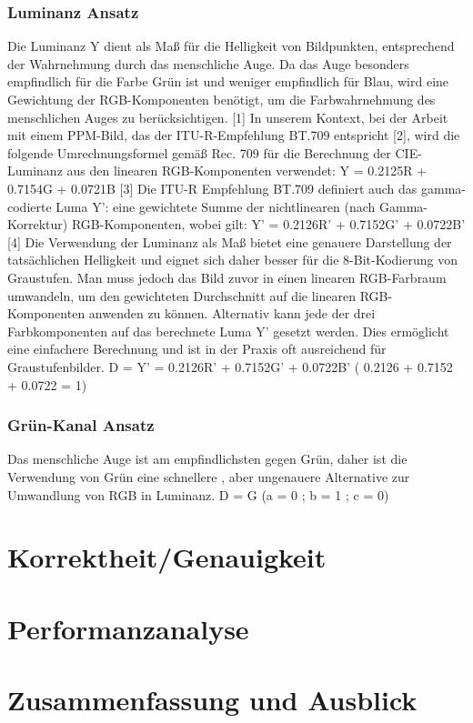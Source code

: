 \documentclass[course=erap]{aspdoc}
\begin{document}
\subsubsection{Luminanz Ansatz}
Die Luminanz Y dient als Maß für die Helligkeit von Bildpunkten, entsprechend der Wahrnehmung durch das menschliche Auge. Da das Auge besonders empfindlich für die Farbe Grün ist und weniger empfindlich für Blau, wird eine Gewichtung der RGB-Komponenten benötigt, um die Farbwahrnehmung des menschlichen Auges zu berücksichtigen. [1]
In unserem Kontext, bei der Arbeit mit einem PPM-Bild, das der ITU-R-Empfehlung BT.709 entspricht [2], wird die folgende Umrechnungsformel gemäß Rec. 709 für die Berechnung der CIE-Luminanz aus den linearen RGB-Komponenten verwendet:
Y = 0.2125R + 0.7154G + 0.0721B  [3]
Die ITU-R Empfehlung BT.709 definiert auch das gamma-codierte Luma Y': eine gewichtete Summe der nichtlinearen (nach Gamma-Korrektur) RGB-Komponenten, wobei gilt:
Y' = 0.2126R' + 0.7152G' + 0.0722B' [4]
Die Verwendung der Luminanz als Maß bietet eine genauere Darstellung der tatsächlichen Helligkeit und eignet sich daher besser für die 8-Bit-Kodierung von Graustufen. Man muss jedoch das Bild zuvor in einen linearen RGB-Farbraum umwandeln, um den gewichteten Durchschnitt auf die linearen RGB-Komponenten anwenden zu können.
Alternativ kann jede der drei Farbkomponenten auf das berechnete Luma Y' gesetzt werden. Dies ermöglicht eine einfachere Berechnung und ist in der Praxis oft ausreichend für Graustufenbilder.
D = Y' = 0.2126R' + 0.7152G' + 0.0722B' (  0.2126 + 0.7152 + 0.0722 = 1)

\subsubsection{Grün-Kanal Ansatz}
Das menschliche Auge ist am empfindlichsten gegen Grün, daher ist die Verwendung von Grün eine schnellere , aber ungenauere  Alternative zur Umwandlung von RGB in Luminanz.
D = G (a = 0 ; b = 1 ; c = 0)


\section{Korrektheit/Genauigkeit}


\section{Performanzanalyse}


\section{Zusammenfassung und Ausblick}


{}
\end{document}
